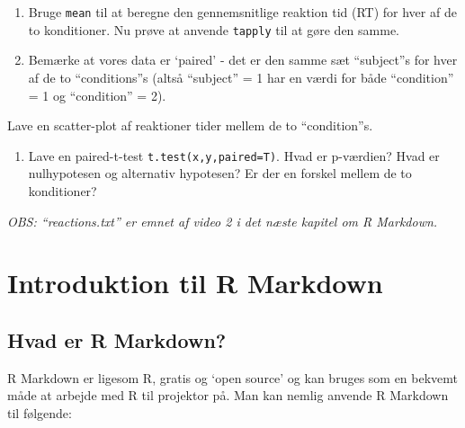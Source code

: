 \documentclass[
]{book}
\newenvironment{Shaded}{\begin{snugshade}}{\end{snugshade}}
\newcommand{\CommentTok}[1]{\textcolor[rgb]{0.56,0.35,0.01}{\textit{#1}}}
\newcommand{\DocumentationTok}[1]{\textcolor[rgb]{0.56,0.35,0.01}{\textbf{\textit{#1}}}}
\newcommand{\FunctionTok}[1]{\textcolor[rgb]{0.00,0.00,0.00}{#1}}
\newcommand{\NormalTok}[1]{#1}
\newcommand{\OtherTok}[1]{\textcolor[rgb]{0.56,0.35,0.01}{#1}}
\newcommand{\SpecialCharTok}[1]{\textcolor[rgb]{0.00,0.00,0.00}{#1}}
\providecommand{\tightlist}{%
  \setlength{\itemsep}{0pt}\setlength{\parskip}{0pt}}
\begin{document}
\begin{Shaded}
\end{Shaded}

\begin{enumerate}
\def\labelenumi{\arabic{enumi})}
\setcounter{enumi}{7}
\item
  Bruge \texttt{mean} til at beregne den gennemsnitlige reaktion tid (RT) for hver af de to konditioner. Nu prøve at anvende \texttt{tapply} til at gøre den samme.
\item
  Bemærke at vores data er `paired' - det er den samme sæt ``subject''s for hver af de to ``conditions''s (altså ``subject'' = 1 har en værdi for både ``condition'' = 1 og ``condition'' = 2).
\end{enumerate}

Lave en scatter-plot af reaktioner tider mellem de to ``condition''s.

\begin{enumerate}
\def\labelenumi{\arabic{enumi})}
\setcounter{enumi}{9}
\tightlist
\item
  Lave en paired-t-test \texttt{t.test(x,y,paired=T)}. Hvad er p-værdien? Hvad er nulhypotesen og alternativ hypotesen? Er der en forskel mellem de to konditioner?
\end{enumerate}

\emph{OBS: ``reactions.txt'' er emnet af video 2 i det næste kapitel om R Markdown.}

\hypertarget{introduktion}{%
\chapter{Introduktion til R Markdown}\label{introduktion}}

\hypertarget{hvad-er-r-markdown}{%
\section{Hvad er R Markdown?}\label{hvad-er-r-markdown}}

R Markdown er ligesom R, gratis og `open source' og kan bruges som en bekvemt måde at arbejde med R til projektor på. Man kan nemlig anvende R Markdown til følgende:
\end{document}
